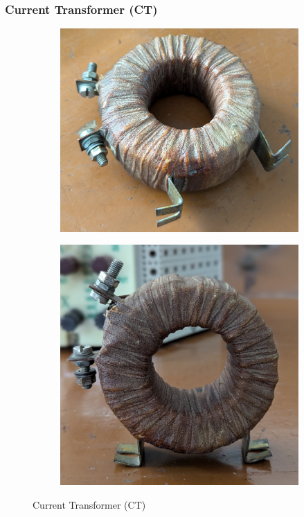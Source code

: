 \documentclass[a4paper,12pt]{article}
\begin{document}
	\subsubsection{Current Transformer (CT)}
			\begin{figure}[H]
		\centering
		\begin{subfigure}[t]{0.49\textwidth}
			\centering
			\includegraphics[width=0.9\linewidth]{Images/25}
			\caption{}
		\end{subfigure}
		\hfill
		\begin{subfigure}[t]{0.49\textwidth}
			\centering
			\includegraphics[width=0.9\linewidth]{Images/26}
			\caption{}
		\end{subfigure}
		
		\caption{Current Transformer (CT)}
		\label{fig:5}
	\end{figure}
	
\end{document}
